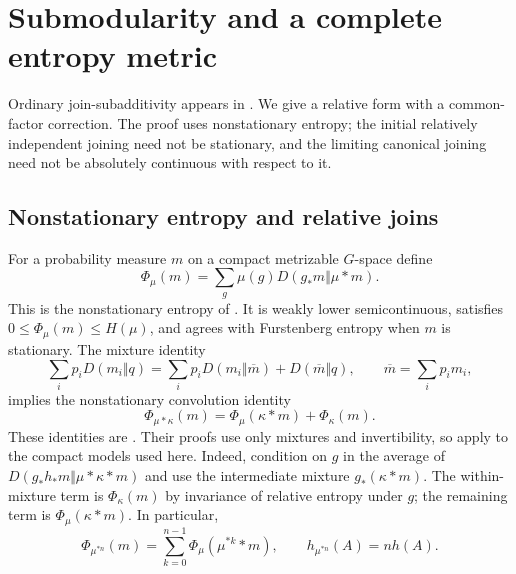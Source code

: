 \documentclass[11pt,letterpaper]{amsart}
\theoremstyle{definition}
\theoremstyle{remark}
\numberwithin{equation}{section}
\begin{document}
\section{Submodularity and a complete entropy metric}\label{sec:submodular}

Ordinary join-subadditivity appears in
\cite[Section 4, proof of Theorem 1.3]{TZ}. We give a relative form
with a common-factor correction. The proof uses nonstationary entropy;
the initial relatively independent joining need not be stationary,
and the limiting canonical joining need not be absolutely continuous
with respect to it.

\subsection{Nonstationary entropy and relative joins}

For a probability measure $m$ on a compact metrizable $G$-space define
\[
 \Phi_\mu(m)=\sum_g\mu(g)D(g_*m\Vert\mu*m).
\]
This is the nonstationary entropy of
\cite[Definition 2.3]{GK}. It is weakly lower semicontinuous,
satisfies $0\le\Phi_\mu(m)\le H(\mu)$, and agrees with Furstenberg
entropy when $m$ is stationary. The mixture identity
\[
 \sum_i p_iD(m_i\Vert q)
 =\sum_i p_iD(m_i\Vert\overline m)+D(\overline m\Vert q),
 \qquad \overline m=\sum_i p_i m_i,
\]
implies the nonstationary convolution identity
\begin{equation}\label{eq:Phi-cocycle}
 \Phi_{\mu*\kappa}(m)
 =\Phi_\mu(\kappa*m)+\Phi_\kappa(m).
\end{equation}
These identities are \cite[Lemma 2.8 and Proposition 2.10]{GK}.
Their proofs use only mixtures and invertibility, so apply to the
compact models used here. Indeed, condition on $g$ in the average of
$D(g_*h_*m\Vert\mu*\kappa*m)$ and use the intermediate mixture
$g_*(\kappa*m)$. The within-mixture term is $\Phi_\kappa(m)$ by
invariance of relative entropy under $g$; the remaining term is
$\Phi_\mu(\kappa*m)$. In particular,
\[
 \Phi_{\mu^{*n}}(m)
 =\sum_{k=0}^{n-1}\Phi_\mu(\mu^{*k}*m),
 \qquad h_{\mu^{*n}}(A)=n h(A).
\]
\end{document}
